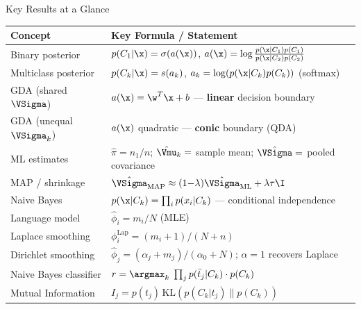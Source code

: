 \begin{frame}{Key Results at a Glance}
  \small
  \begin{tabular}{ll}
    \toprule
    \textbf{Concept} & \textbf{Key Formula / Statement}\\
    \midrule
    Binary posterior & $p(C_1|\x)=\sigma(a(\x))$, $a(\x)=\log\frac{p(\x|C_1)p(C_1)}{p(\x|C_2)p(C_2)}$\\[4pt]
    Multiclass posterior & $p(C_k|\x)=s(a_k)$, $a_k=\log(p(\x|C_k)p(C_k))$ (softmax)\\[4pt]
    GDA (shared $\VSigma$) & $a(\x)=\w^T\x+b$ — \textbf{linear} decision boundary\\[4pt]
    GDA (unequal $\VSigma_k$) & $a(\x)$ quadratic — \textbf{conic} boundary (QDA)\\[4pt]
    ML estimates & $\hat\pi=n_1/n$;\; $\hat\Vmu_k=$ sample mean;\; $\hat\VSigma=$ pooled covariance\\[4pt]
    MAP / shrinkage & $\hat\VSigma_{\mathrm{MAP}}\approx(1{-}\lambda)\hat\VSigma_{\mathrm{ML}}+\lambda\tau\I$\\[4pt]
    Naive Bayes & $p(\x|C_k)=\prod_i p(x_i|C_k)$ — conditional independence\\[4pt]
    Language model & $\hat\phi_i=m_i/N$ (MLE)\\[4pt]
    Laplace smoothing & $\phi_i^{\mathrm{Lap}}=(m_i+1)/(N+n)$\\[4pt]
    Dirichlet smoothing & $\hat\phi_j=(\alpha_j+m_j)/(\alpha_0+N)$; $\alpha=1$ recovers Laplace\\[4pt]
    Naive Bayes classifier & $r=\argmax_k\;\prod_j p(\bar t_j|C_k)\cdot p(C_k)$\\[4pt]
    Mutual Information & $I_j=p(t_j)\,\mathrm{KL}(p(C_k|t_j)\|p(C_k))$\\
    \bottomrule
  \end{tabular}
\end{frame}

